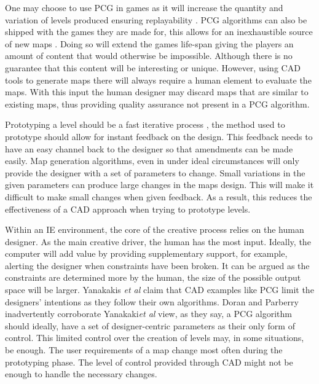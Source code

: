 \documentclass[journal]{IEEEtran}
\begin{document}
One may choose to use PCG in games as it will increase the quantity and variation of levels produced ensuring replayability \cite{karavolos2015mixed}. PCG algorithms can also be shipped with the games they are made for, this allows for an inexhaustible source of new maps \cite{johnson2010cellular}. Doing so will extend the games life-span giving the players an amount of content that would otherwise be impossible. Although there is no guarantee that this content will be interesting or unique. However, using CAD tools to generate maps there will always require a human element to evaluate the maps. With this input the human designer may discard maps that are similar to existing maps, thus providing quality assurance not present in a PCG algorithm.

Prototyping a level should be a fast iterative process \cite{smith2011tanagra}, the method used to prototype should allow for instant feedback on the design. This feedback needs to have an easy channel back to the designer so that amendments can be made easily. Map generation algorithms, even in under ideal circumstances will only provide the designer with a set of parameters to change\cite{doran2010controlled}. Small variations in the given parameters can produce large changes in the maps design\cite{regier2009random}. This will make it difficult to make small changes when given feedback. As a result, this reduces the effectiveness of a CAD approach when trying to prototype levels.

Within an IE environment, the core of the creative process relies on the human designer. As the main creative driver, the human has the most input. Ideally, the computer will add value by providing supplementary support, for example, alerting the designer when constraints have been broken. It can be argued as the constraints are determined more by the human, the size of the possible output space will be larger. Yanakakis \textit{et al} \cite{yannakakis2014mixed} claim that CAD examples like PCG limit the designers' intentions as they follow their own algorithms. Doran and Parberry\cite{doran2010controlled} inadvertently corroborate Yanakaki\textit{et al}\cite{yannakakis2014mixed} view, as they say, a PCG algorithm should ideally, have a set of designer-centric parameters as their only form of control. This limited control over the creation of levels may, in some situations, be enough. The user requirements of a map change most often during the prototyping phase. The level of control provided through CAD might not be enough to handle the necessary changes. 
\end{document}
